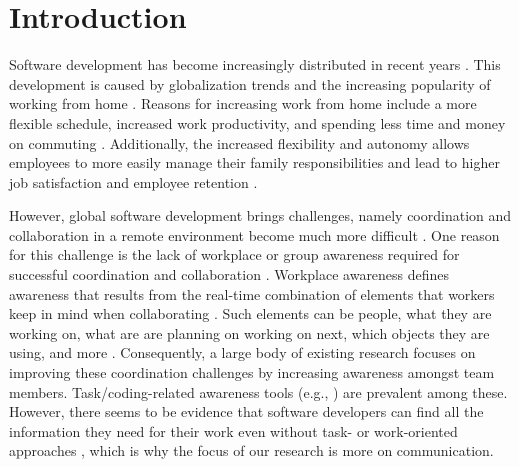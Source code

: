 \chapter{Introduction}
\label{chapter:introduction}
Software development has become increasingly distributed in recent years \autocite{herbsleb2001global}. This development is caused by globalization trends \autocite{herbsleb2007global} and the increasing popularity of working from home \autocite{ecoWorkingFromHome2021}. Reasons for increasing work from home include a more flexible schedule, increased work productivity, and spending less time and money on commuting \autocite{flores2019understanding, mulki2009set}. Additionally, the increased flexibility and autonomy allows employees to more easily manage their family responsibilities and lead to higher job satisfaction and employee retention \autocite{mulki2009set, gajendran2007good, madsen2011benefits}.

However, global software development brings challenges, namely coordination and collaboration in a remote environment become much more difficult \autocite{herbsleb2007global}. One reason for this challenge is the lack of workplace or group awareness required for successful coordination and collaboration \autocite{herbsleb2007global, gutwin2004group}. Workplace awareness defines awareness that results from the real-time combination of elements that workers keep in mind when collaborating \autocite{gutwin1996workspace}. Such elements can be people, what they are working on, what are are planning on working on next, which objects they are using, and more \autocite{gutwin1996workspace}. Consequently, a large body of existing research focuses on improving these coordination challenges by increasing awareness amongst team members. Task/coding-related awareness tools (e.g., \autocite{biehl2007fastdash, jakobsen2009wipdash}) are prevalent among these. However, there seems to be evidence that software developers can find all the information they need for their work even without task- or work-oriented approaches \autocite{gutwin2004group}, which is why the focus of our research is more on communication.

